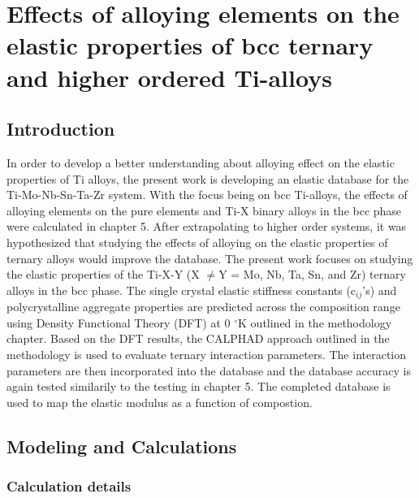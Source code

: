 \chapter{Effects of alloying elements on the elastic properties of bcc ternary and higher ordered Ti-alloys}

\section{Introduction}

In order to develop a better understanding about alloying effect on the elastic properties of Ti alloys, the present work is developing an elastic database for the Ti-Mo-Nb-Sn-Ta-Zr system. With the focus being on bcc Ti-alloys, the effects of alloying elements on the pure elements and Ti-X binary alloys in the bcc phase were calculated in chapter 5. After extrapolating to higher order systems, it was hypothesized that studying the effects of alloying on the elastic properties of ternary alloys would improve the database. The present work focuses on studying the elastic properties of the Ti-X-Y (X $\neq$Y = Mo, Nb, Ta, Sn, and Zr) ternary alloys in the bcc phase. The single crystal elastic stiffness constants (c$_{ij}$'s) and polycrystalline aggregate properties are predicted across the composition range using Density Functional Theory (DFT) at 0 $^\circ$K outlined in the methodology chapter. Based on the DFT results, the CALPHAD approach outlined in the methodology is used to evaluate ternary interaction parameters. The interaction parameters are then incorporated into the database and the database accuracy is again tested similarily to the testing in chapter 5. The completed database is used to map the elastic modulus as a function of compostion. 

\section{Modeling and Calculations}

\subsection{Calculation details}

